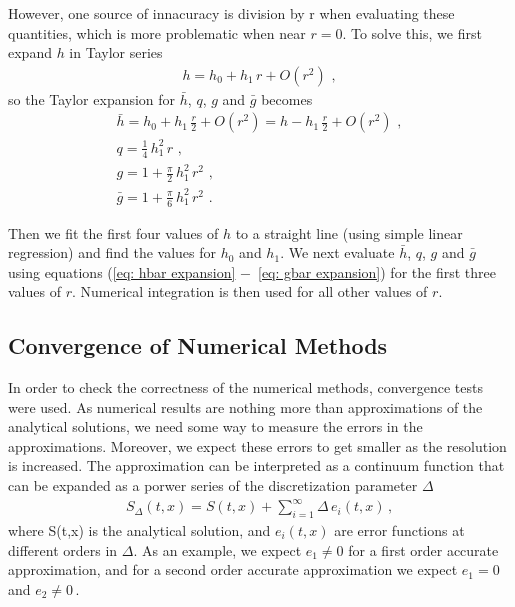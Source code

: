 \documentclass[11pt]{article}
\begin{document}
However, one source of innacuracy is division by r when evaluating these quantities, which is more problematic when near $r=0$. To solve this, we first expand $h$ in Taylor series
\begin{gather}
    h = h_0 + h_1\, r + O(r^2)\, \,,\label{eq: h expansion}
\end{gather}
so the Taylor expansion for $\bar h$, $q$, $g$ and $\bar g$ becomes
\begin{gather}
    \bar h = h_0 + h_1\, \frac{r}{2} + O(r^2) = h - h_1 \,\frac{r}{2} + O(r^2)\,\,,\label{eq: hbar expansion}\\
    q = \frac{1}{4}\, h_1^2 \,r\,\,,\label{eq: q expansion}\\
    g = 1 + \frac{\pi}{2}\, h_1^2\, r^2\,\,,\label{eq: g expansion}\\
    \bar g = 1 + \frac{\pi}{6} \, h_1^2\, r^2\,\,.\label{eq: gbar expansion}
\end{gather}

Then we fit the first four values of $h$ to a straight line (using simple linear regression) and find the values for $h_0$ and $h_1$. We next evaluate $\bar h$, $q$, $g$ and $\bar g$ using equations (\ref{eq: hbar expansion} $-$~\ref{eq: gbar expansion}) for the first three values of $r$. Numerical integration is then used for all other values of $r$.

\subsection{Convergence of Numerical Methods}

In order to check the correctness of the numerical methods, convergence tests were used. As numerical results are nothing more than approximations of the analytical solutions, we need some way to measure the errors in the approximations. Moreover, we expect these errors to get smaller as the resolution is increased.
The approximation can be interpreted as a continuum function that can be expanded as a porwer series of the discretization parameter $\Delta$
\begin{gather}
    S_\Delta (t,x) = S(t,x) + \sum_{i=1}^{\infty}\Delta\,e_i(t,x) \, ,
\end{gather}
where S(t,x) is the analytical solution, and $e_i(t,x)$ are error functions at different orders in $\Delta$. As an example, we expect $e_1 \neq 0$ for a first order accurate approximation, and for a second order accurate approximation we expect $e_1=0$ and $e_2\neq0\,$. 
\end{document}

